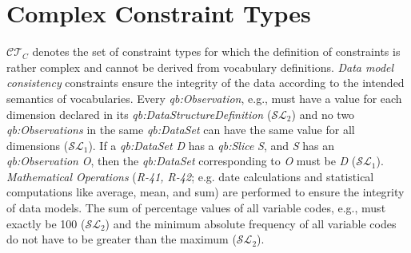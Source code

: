 \documentclass{llncs}
\begin{document}
{{\section{Complex Constraint Types}
\label{complex-constraint-types}


$\mathcal{CT}_{C}$ denotes the set of constraint types for which the definition of constraints is rather complex and cannot be derived from vocabulary definitions.
\emph{Data model consistency} constraints ensure the integrity of
the data according to the intended semantics of vocabularies.
Every \emph{qb:Observation}, e.g., must have a value for each dimension
declared in its \emph{qb:DataStructureDefinition} ($\mathcal{SL}_{2}$)
and no two \emph{qb:Observations} in the same \emph{qb:DataSet}
can have the same value for all dimensions ($\mathcal{SL}_{1}$).
If a \emph{qb:DataSet} \emph{D} has a \emph{qb:Slice} \emph{S}, and \emph{S} has an
\emph{qb:Observation} \emph{O}, then the \emph{qb:DataSet} corresponding to \emph{O} must be \emph{D} ($\mathcal{SL}_{1}$).
{\em Mathematical Operations} (\emph{R-41, R-42}; e.g. date calculations and statistical computations like average, mean, and sum) are performed to ensure the integrity of data models.
The sum of percentage values of all variable codes, e.g., must exactly be 100 ($\mathcal{SL}_{2}$)
and the minimum absolute frequency of all variable codes do not have to be greater than the maximum ($\mathcal{SL}_{2}$).


}}
\end{document}
